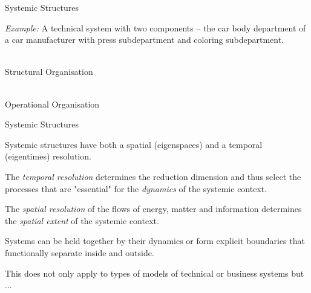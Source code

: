 \documentclass{beamer}
\begin{document}
\begin{frame}{Systemic Structures}

  \emph{Example:} A technical system with two components -- the car body
  department of a car manufacturer with press subdepartment and coloring
  subdepartment.
    
  \begin{minipage}{.42\textwidth}\centering\vspace*{2em}
    \\[2em] Structural Organisation
  \end{minipage}\hfill
  \begin{minipage}{.55\textwidth}\centering
    \\[2em] Operational Organisation
  \end{minipage}
\end{frame}

\begin{frame}{Systemic Structures}

Systemic structures have both a spatial (eigenspaces) and a temporal
(eigentimes) resolution.

The \emph{temporal resolution} determines the reduction dimension and thus
select the processes that are "essential" for the \emph{dynamics} of the
systemic context.

The \emph{spatial resolution} of the flows of energy, matter and information
determines the \emph{spatial extent} of the systemic context.

Systems can be held together by their dynamics or form explicit boundaries
that functionally separate inside and outside.

This does not only apply to types of models of technical or business systems
but ...
\end{frame}
\end{document}
